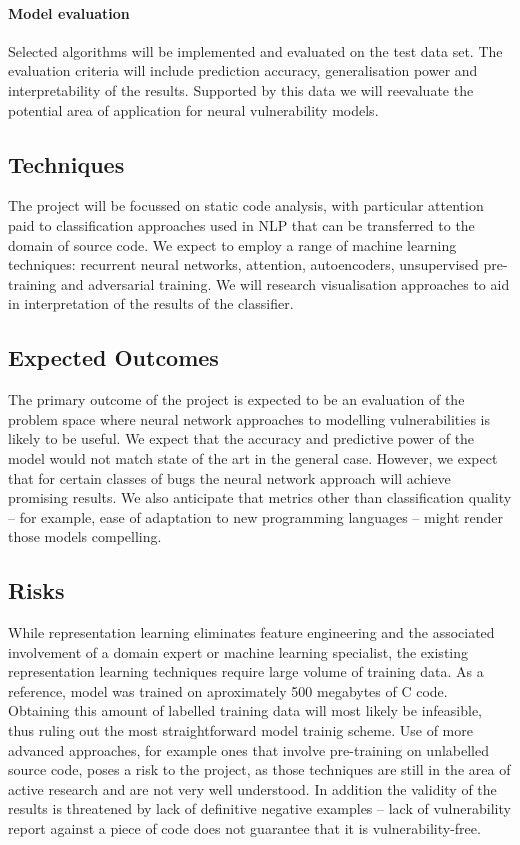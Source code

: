 \documentclass[proposal]{softeng}
\begin{document}
\paragraph{Model evaluation} Selected algorithms will be implemented and
evaluated on the test data set. The evaluation criteria will include 
prediction accuracy, generalisation power and interpretability of the
results. Supported by this data we will reevaluate the potential area
of application for neural vulnerability models.

\subsection{Techniques}

The project will be focussed on static code analysis, with
particular attention paid to classification approaches used
in NLP that can be transferred to the domain of source code. We expect
to employ a range of machine learning techniques: recurrent neural
networks, attention, autoencoders, unsupervised pre-training and 
adversarial training. We will research visualisation approaches to
aid in interpretation of the results of the classifier.

\subsection{Expected Outcomes}

The primary outcome of the project is expected to be an evaluation
of the problem space where neural network approaches to modelling vulnerabilities
is likely to be useful. We expect that the accuracy and predictive power
of the model would not match state of the art in the general case. However,
we expect that for certain classes of bugs the neural network approach
will achieve promising results. We also anticipate that metrics other than
classification quality -- for example, ease of adaptation to new programming 
languages -- might render those models compelling.


\subsection{Risks}

While representation learning eliminates feature engineering and the associated
involvement of a domain expert or machine learning specialist, the existing 
representation learning techniques
require large volume of training data. As a reference, \cite{karpathy2015unreasonable} 
model was 
trained on aproximately 500 megabytes of C code. Obtaining this amount of labelled 
training data will most likely be infeasible, thus ruling out the most straightforward
model trainig scheme. Use of more advanced approaches, for example ones that involve
pre-training on unlabelled source code, poses a risk to the project, as those techniques
are still in the area of active research and are not very well understood. In addition
the validity of the results is threatened by lack of definitive negative examples --
lack of vulnerability report against a piece of code does not guarantee that it is
vulnerability-free.
\end{document}

